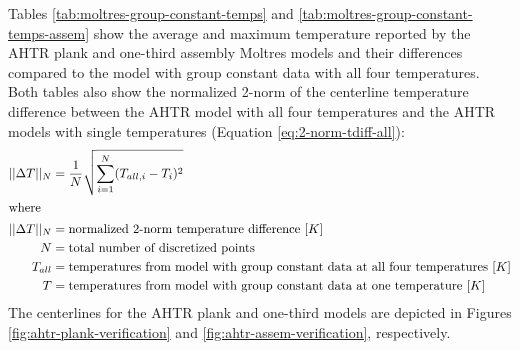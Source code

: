 Tables \ref{tab:moltres-group-constant-temps} and 
\ref{tab:moltres-group-constant-temps-assem}
show the average and maximum temperature reported by the \gls{AHTR} plank and one-third 
assembly Moltres models and their differences compared to the model with group constant data 
with all four temperatures. 
Both tables also show the normalized 2-norm of the centerline temperature difference 
between the AHTR model with all four temperatures and the AHTR models with single 
temperatures (Equation \ref{eq:2-norm-tdiff-all}):
\begin{align}
    \label{eq:2-norm-tdiff-all}
    ||\Delta T||_N &= \frac{1}{N}\sqrt{\sum_{i=1}^N(T_{all, i} - T_{i})^2} \\
\intertext{where}
    ||\Delta T||_N &= \mbox{normalized 2-norm temperature difference } [K]\nonumber \\
    N &= \mbox{total number of discretized points} \nonumber \\
    T_{all} &= \mbox{temperatures from model with group constant data at all four temperatures } [K] \nonumber \\
    T &= \mbox{temperatures from model with group constant data at one temperature } [K] \nonumber 
\end{align}
The centerlines for the \gls{AHTR} plank and one-third models are depicted in Figures 
\ref{fig:ahtr-plank-verification} and \ref{fig:ahtr-assem-verification}, respectively. 


